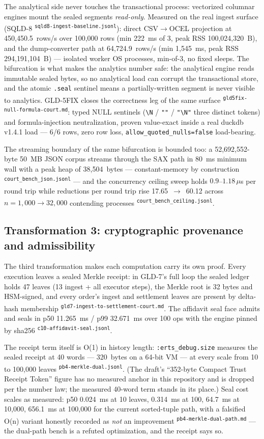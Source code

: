 \documentclass[11pt,a4paper]{article}
\newcommand{\art}[1]{\textsuperscript{\tiny\texttt{#1}}}
\begin{document}
The analytical side never touches the transactional process: vectorized columnar engines
mount the sealed segments \emph{read-only}. Measured on the real ingest surface (SQLD-8
\art{sqld8-ingest-baseline.jsonl}): direct CSV$\to$OCEL projection at
450{,}450.5~rows/s over 100{,}000 rows (min 222~ms of 3, peak RSS 100{,}024{,}320~B), and the
dump-converter path at 64{,}724.9~rows/s (min 1{,}545~ms, peak RSS 294{,}191{,}104~B) ---
isolated worker OS processes, min-of-3, no fixed sleeps. The bifurcation is what makes the
analytics number safe: the analytical engine reads immutable sealed bytes, so no analytical
load can corrupt the transactional store, and the atomic \texttt{.seal} sentinel means a
partially-written segment is never visible to analytics. GLD-5FIX closes the correctness
leg of the same surface \art{gld5fix-null-formula-court.md}: typed NULL sentinels
(\texttt{\textbackslash N} / \texttt{""} / \texttt{"\textbackslash N"} three distinct
tokens) and formula-injection neutralization, proven value-exact inside a real duckdb
v1.4.1 load --- 6/6 rows, zero row loss, \texttt{allow\_quoted\_nulls=false} load-bearing.

The streaming boundary of the same bifurcation is bounded too: a 52{,}692{,}552-byte
50~MB JSON corpus streams through the SAX path in 80~ms minimum wall with a peak heap of
38{,}504~bytes --- constant-memory by construction
\art{court\_bench\_json.jsonl} --- and the concurrency ceiling sweep holds
$0.9$--$1.18\,\mu$s per round trip while reductions per round trip rise 17.65~$\rightarrow$~60.12
across $n=1{,}000\to32{,}000$ contending processes \art{court\_bench\_ceiling.jsonl}.

\subsection{Transformation 3: cryptographic provenance and admissibility}

The third transformation makes each computation carry its own proof. Every execution leaves
a sealed Merkle receipt: in GLD-7's full loop the sealed ledger holds 47 leaves (13 ingest +
all executor steps), the Merkle root is 32 bytes and HSM-signed, and every order's ingest and
settlement leaves are present by delta-hash membership
\art{gld7-ingest-to-settlement-court.md}. The affidavit seal face admits and seals in
p50 11.265~ms / p99 32.671~ms over 100 ops with the engine pinned by sha256
\art{c10-affidavit-seal.jsonl}.

The receipt term itself is O(1) in history length: \texttt{:erts\_debug.size} measures the
sealed receipt at 40 words --- 320~bytes on a 64-bit VM --- at every scale from 10 to
100{,}000 leaves \art{pb4-merkle-dual.jsonl}. (The draft's ``352-byte Compact Trust Receipt
Token'' figure has no measured anchor in this repository and is dropped per the number law;
the measured 40-word term stands in its place.) Seal cost scales as measured: p50 0.024~ms
at 10 leaves, 0.314~ms at 100, 64.7~ms at 10{,}000, 656.1~ms at 100{,}000 for the current
sorted-tuple path, with a falsified O(n) variant honestly recorded as
\emph{not} an improvement \art{pb4-merkle-dual-path.md} --- the dual-path bench is a refuted
optimization, and the receipt says so.
\end{document}
